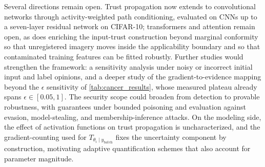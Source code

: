 Several directions remain open. Trust propagation now extends to convolutional networks through activity-weighted path conditioning, evaluated on CNNs up to a seven-layer residual network on CIFAR-10; transformers and attention remain open, as does enriching the input-trust construction beyond marginal conformity so that unregistered imagery moves inside the applicability boundary and so that contaminated training features can be fitted robustly. Further studies would strengthen the framework: a sensitivity analysis under noisy or incorrect initial input and label opinions, and a deeper study of the gradient-to-evidence mapping beyond the $\epsilon$ sensitivity of \cref{tab:cancer_results}, whose measured plateau already spans $\epsilon \in [0.05, 1]$. The security scope could broaden from detection to provable robustness, with guarantees under bounded poisoning and evaluation against evasion, model-stealing, and membership-inference attacks. On the modeling side, the effect of activation functions on trust propagation is uncharacterized, and the gradient-counting used for \(T_{\theta_i \mid y_\text{batch}}\) fixes the uncertainty component by construction, motivating adaptive quantification schemes that also account for parameter magnitude.
